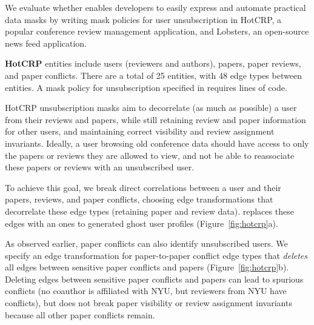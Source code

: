 We evaluate whether \name enables developers to easily express and automate practical data masks by
writing mask policies for user unsubscription in HotCRP, a popular conference review management
application, and Lobsters, an open-source news feed application. 

\textbf{HotCRP} entities include users (reviewers and authors), papers, paper reviews, and
paper conflicts. There are a total of 25 entities, with 48 edge types between entities. A
mask policy for unsubscription specified in \sys requires  lines of code.

HotCRP unsubscription masks aim to decorrelate (as much as possible) a user from their reviews and
papers, while still retaining review and paper information for other users, and maintaining correct
visibility and review assignment invariants. Ideally, a user browsing old conference data should
have access to only the papers or reviews they are allowed to view, and not be able to reassociate
these papers or reviews with an unsubscribed user.

To achieve this goal, we break direct correlations between a user and their papers,
reviews, and paper conflicts, choosing edge transformations that decorrelate these edge types
(retaining paper and review data). \sys replaces these edges with an ones to generated ghost user
profiles (Figure~\ref{fig:hotcrp}a).


As observed earlier, paper conflicts can also identify unsubscribed users. We specify  
an edge transformation for paper-to-paper conflict edge types that \emph{deletes} all
edges between sensitive paper conflicts and papers (Figure~\ref{fig:hotcrp}b).
Deleting edges between sensitive paper conflicts and papers can lead to spurious conflicts (\eg no
coauthor is affiliated with NYU, but reviewers from NYU have conflicts), but does not break paper
visibility or review assignment invariants because all other paper conflicts remain. 

